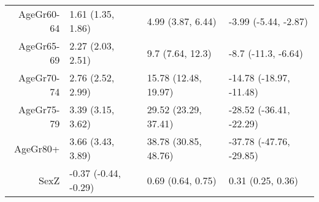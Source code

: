 \begin{table}[ht]
\begin{tabular}{rlll}
  AgeGr60-64 & 1.61 (1.35, 1.86) & 4.99 (3.87, 6.44) & -3.99 (-5.44, -2.87) \\ 
  AgeGr65-69 & 2.27 (2.03, 2.51) & 9.7 (7.64, 12.3) & -8.7 (-11.3, -6.64) \\ 
  AgeGr70-74 & 2.76 (2.52, 2.99) & 15.78 (12.48, 19.97) & -14.78 (-18.97, -11.48) \\ 
  AgeGr75-79 & 3.39 (3.15, 3.62) & 29.52 (23.29, 37.41) & -28.52 (-36.41, -22.29) \\ 
  AgeGr80+ & 3.66 (3.43, 3.89) & 38.78 (30.85, 48.76) & -37.78 (-47.76, -29.85) \\ 
  SexZ & -0.37 (-0.44, -0.29) & 0.69 (0.64, 0.75) & 0.31 (0.25, 0.36) \\ 
   \hline
\end{tabular}
\end{table}
